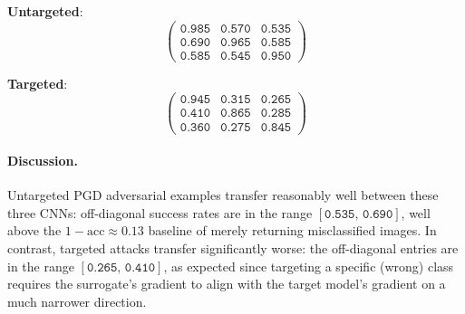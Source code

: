 \documentclass[11pt]{article}
\begin{document}
\textbf{Untargeted}:
\[
\begin{pmatrix}
\texttt{0.985} & \texttt{0.570} & \texttt{0.535} \\
\texttt{0.690} & \texttt{0.965} & \texttt{0.585} \\
\texttt{0.585} & \texttt{0.545} & \texttt{0.950}
\end{pmatrix}
\]

\textbf{Targeted}:
\[
\begin{pmatrix}
\texttt{0.945} & \texttt{0.315} & \texttt{0.265} \\
\texttt{0.410} & \texttt{0.865} & \texttt{0.285} \\
\texttt{0.360} & \texttt{0.275} & \texttt{0.845}
\end{pmatrix}
\]

\paragraph{Discussion.}
Untargeted PGD adversarial examples transfer reasonably well between these
three CNNs: off-diagonal success rates are in the range
\([\texttt{0.535},\,\texttt{0.690}]\), well above the
\(1{-}\mathrm{acc}\approx 0.13\) baseline of merely returning misclassified
images. In contrast, targeted attacks transfer significantly worse: the
off-diagonal entries are in the range
\([\texttt{0.265},\,\texttt{0.410}]\), as expected since
targeting a specific (wrong) class requires the surrogate's gradient to
align with the target model's gradient on a much narrower direction.
\end{document}
